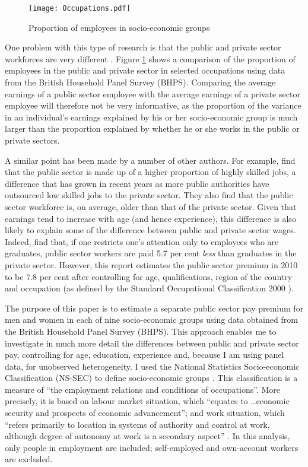 \documentclass[a4paper,11pt,titlepage]{article}
\begin{document}
\begin{figure}[htb]
    \centering
    \texttt{[image: Occupations.pdf]}
    \caption{Proportion of employees in socio-economic groups\label{fig:segs}}
\end{figure}

 One problem with this type of research is that the public and private sector workforces are very different \citep{IDS2011}.  Figure \ref{fig:segs} shows a comparison of the proportion of employees in the public and private sector in selected occupations using data from the British Household Panel Survey (BHPS).  Comparing the average earnings of a public sector employee with the average earnings of a private sector employee will therefore not be very informative, as the proportion of the variance in an individual's earnings explained by his or her socio-economic group is much larger than the proportion explained by whether he or she works in the public or private sectors.

A similar point has been made by a number of other authors.  For example, \citet{Damant2011}
 find that the public sector is made up of a higher proportion of highly skilled jobs, a difference that has grown in recent years as more public authorities have outsourced low skilled jobs to the private sector.  They also find that the public sector workforce is, on average, older than that of the private sector.  Given that earnings tend to increase with age (and hence experience), this difference is also likely to explain some of the difference between public and private sector wages.  Indeed, \citet{Damant2011} find that, if one restricts one's attention only to employees who are graduates, public sector workers are paid 5.7 per cent \emph{less} than graduates in the private sector.  However, this report estimates the public sector premium in 2010 to be 7.8 per cent after controlling for age, qualifications, region of the country and occupation (as defined by the Standard Occupational Classification 2000 \citep{SOC2000}).

 The purpose of this paper is to estimate a separate public sector pay premium for men and women in each of nine socio-economic groups using data obtained from the British Household Panel Survey (BHPS).  This approach enables me to investigate in much more detail the differences between public and private sector pay, controlling for age, education, experience and, because I am using panel data, for unobserved heterogeneity. I used the National Statistics Socio-economic Classification (NS-SEC) to define socio-economic groups \citep{ONSSEC}.  This classification is a measure of ``the employment relations and conditions of occupations''. More precisely, it is based on labour market situation, which ``equates to \dots economic security and prospects of economic advancement''; and  work situation, which ``refers primarily to location in systems of authority and control at work, although degree of autonomy at work is a secondary aspect'' \citep{ONSSEC}. In this analysis, only people in employment are included; self-employed and own-account workers are excluded.
\end{document}
